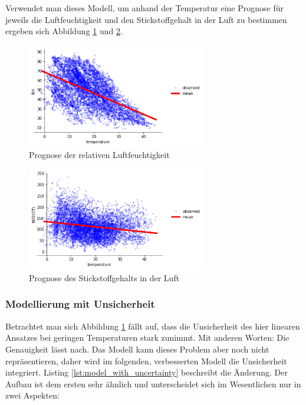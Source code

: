 \documentclass[12pt]{article}
\begin{document}
Verwendet man dieses Modell, um anhand der Temperatur eine Prognose für jeweils die Luftfeuchtigkeit und den Stickstoffgehalt in der Luft zu bestimmen ergeben sich Abbildung \ref{fig:no_unc_rh} und \ref{fig:no_unc_no2}.

\begin{figure}[h]
    \centering
    \includegraphics[width=0.7\textwidth]{./figs/no_unc_rh.png}
    \caption{Prognose der relativen Luftfeuchtigkeit}
    \label{fig:no_unc_rh}
\end{figure}

\begin{figure}[h]
    \centering
    \includegraphics[width=0.7\textwidth]{./figs/no_unc_no2.png}
    \caption{Prognose des Stickstoffgehalts in der Luft}
    \label{fig:no_unc_no2}
\end{figure}


\subsubsection{Modellierung mit Unsicherheit}
\label{sec:with_unc}

Betrachtet man sich Abbildung \ref{fig:no_unc_rh} fällt auf, dass die Unsicherheit des hier linearen Ansatzes bei geringen Temperaturen stark zunimmt. Mit anderen Worten: Die Genauigkeit lässt nach. Das Modell kann dieses Problem aber noch nicht repräsentieren, daher wird im folgenden, verbesserten Modell die Unsicherheit integriert. Listing \ref{lst:model_with_uncertainty} beschreibt die Änderung. Der Aufbau ist dem ersten sehr ähnlich und unterscheidet sich im Wesentlichen nur in zwei Aspekten: 
\end{document}
